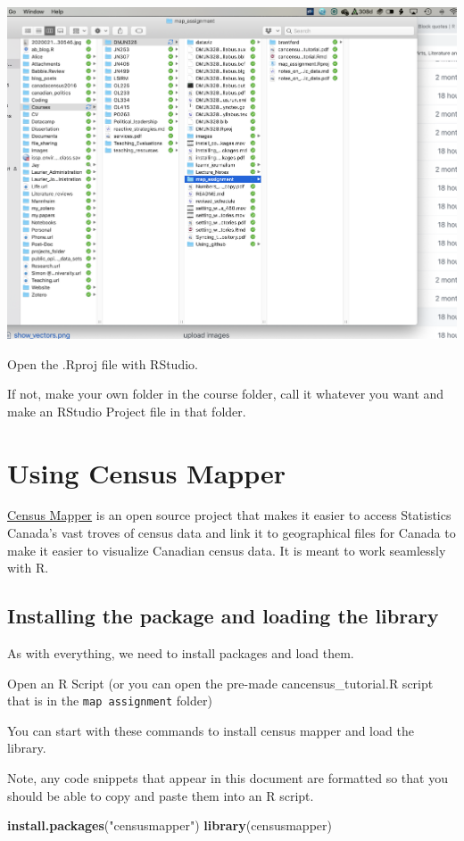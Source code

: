\documentclass[
]{article}
\newenvironment{Shaded}{\begin{snugshade}}{\end{snugshade}}
\newcommand{\KeywordTok}[1]{\textcolor[rgb]{0.13,0.29,0.53}{\textbf{#1}}}
\newcommand{\NormalTok}[1]{#1}
\newcommand{\StringTok}[1]{\textcolor[rgb]{0.31,0.60,0.02}{#1}}
\begin{document}
\begin{center}\includegraphics[width=0.5\linewidth]{images/map_assignment} \end{center}

Open the .Rproj file with RStudio.

If not, make your own folder in the course folder, call it whatever you
want and make an RStudio Project file in that folder.

\hypertarget{using-census-mapper}{%
\section{Using Census Mapper}\label{using-census-mapper}}

\href{http://www.censusmapper.ca}{Census Mapper} is an open source
project that makes it easier to access Statistics Canada's vast troves
of census data and link it to geographical files for Canada to make it
easier to visualize Canadian census data. It is meant to work seamlessly
with R.

\hypertarget{installing-the-package-and-loading-the-library}{%
\subsection{Installing the package and loading the
library}\label{installing-the-package-and-loading-the-library}}

As with everything, we need to install packages and load them.

Open an R Script (or you can open the pre-made cancensus\_tutorial.R
script that is in the \texttt{map\ assignment} folder)

You can start with these commands to install census mapper and load the
library.

Note, any code snippets that appear in this document are formatted so
that you should be able to copy and paste them into an R script.

\begin{Shaded}
\begin{Highlighting}[]
\KeywordTok{install.packages}\NormalTok{(}\StringTok{"censusmapper"}\NormalTok{)}
\KeywordTok{library}\NormalTok{(censusmapper)}
\end{Highlighting}
\end{Shaded}
\end{document}

